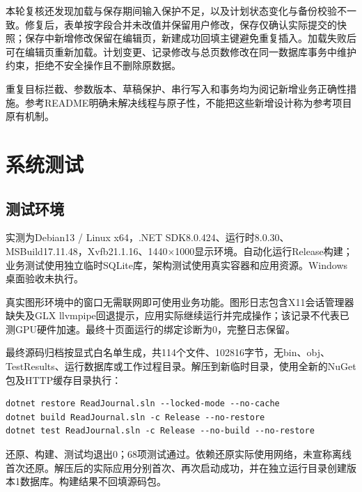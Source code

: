 \documentclass[UTF8,a4paper,11pt,fontset=none]{ctexart}
\begin{document}
本轮复核还发现加载与保存期间输入保护不足，以及计划状态变化与备份校验不一致。修复后，表单按字段合并未改值并保留用户修改，保存仅确认实际提交的快照；保存中新增修改保留在编辑页，新建成功回填主键避免重复插入。加载失败后可在编辑页重新加载。计划变更、记录修改与总页数修改在同一数据库事务中维护约束，拒绝不安全操作且不删除原数据。

重复目标拦截、参数版本、草稿保护、串行写入和事务均为阅记新增业务正确性措施。参考README明确未解决线程与原子性，不能把这些新增设计称为参考项目原有机制。
\section{系统测试}
\subsection{测试环境}
实测为Debian13 / Linux x64，.NET SDK8.0.424、运行时8.0.30、MSBuild17.11.48，Xvfb21.1.16、1440×1000显示环境。自动化运行Release构建；业务测试使用独立临时SQLite库，架构测试使用真实容器和应用资源。Windows桌面验收未执行。

真实图形环境中的窗口无需联网即可使用业务功能。图形日志包含X11会话管理器缺失及GLX llvmpipe回退提示，应用实际继续运行并完成操作；该记录不代表已测GPU硬件加速。最终十页面运行的绑定诊断为0，完整日志保留。

最终源码归档按显式白名单生成，共114个文件、102816字节，无bin、obj、TestResults、运行数据库或工作过程目录。解压到新临时目录，使用全新的NuGet包及HTTP缓存目录执行：
\begin{Verbatim}[fontsize=\small,breaklines=true]
dotnet restore ReadJournal.sln --locked-mode --no-cache
dotnet build ReadJournal.sln -c Release --no-restore
dotnet test ReadJournal.sln -c Release --no-build --no-restore
\end{Verbatim}

还原、构建、测试均退出0；68项测试通过。依赖还原实际使用网络，未宣称离线首次还原。解压后的实际应用分别首次、再次启动成功，并在独立运行目录创建版本1数据库。构建结果不回填源码包。
\end{document}
